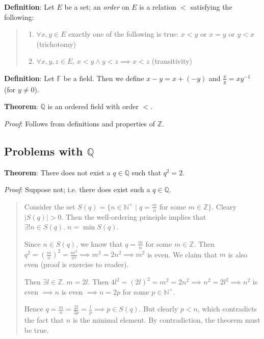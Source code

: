 \documentclass[11pt]{article}
\begin{document}
\textbf{Definition}: Let $E$ be a set; an \emph{order} on $E$ is a relation $<$ satisfying the following:
\begin{quote}\vspace{-0.3cm}
	\begin{enumerate}
	\item $\forall x,y \in E$ exactly one of the following is true: $x < y$ or $x = y$ or $y < x$ (trichotomy)
	\item $\forall x,y,z \in E$, $x < y \land y < z \implies x < z$ (transitivity)
	\end{enumerate}
\end{quote}

\textbf{Definition}: Let $\mathbb{F}$ be a field. Then we define $x - y = x + (-y)$ and $\frac{x}{y} = xy^{-1}$ (for $y \neq 0$).

\textbf{Theorem}: $\mathbb{Q}$ is an ordered field with order $<$.

\emph{Proof}: Follows from definitions and properties of $\mathbb{Z}$.


\subsection{Problems with $\mathbb{Q}$}

\textbf{Theorem}: There does not exist a $q \in \mathbb{Q}$ such that $q^2 = 2$.

\emph{Proof}: Suppose not; i.e. there does exist such a $q \in \mathbb{Q}$.
\begin{quote}\vspace{-0.3cm}
Consider the set $S(q) = \{n \in \mathbb{N}^+ \;|\; q = \frac{m}{n}$ for some $m \in \mathbb{Z}\}$. Cleary $|S(q)| > 0$. Then the well-ordering principle implies that $\exists !n \in S(q).\; n = \min S(q)$.

Since $n \in S(q)$, we know that $q = \frac{m}{n}$ for some $m \in \mathbb{Z}$. Then $q^2 = (\frac{m}{n})^2 = \frac{m^2}{n^2} \implies m^2 = 2n^2 \implies m^2$ is even. We claim that $m$ is also even (proof is exercise to reader).

Then $\exists l \in \mathbb{Z}.\; m = 2l$. Then $4l^2 = (2l)^2 = m^2 = 2n^2 \implies n^2 = 2l^2 \implies n^2$ is even $\implies n$ is even $\implies n = 2p$ for some $p \in \mathbb{N}^+$.

Hence $q = \frac{m}{n} = \frac{2l}{2p} = \frac{l}{p} \implies p \in S(q)$. But clearly $p < n$, which contradicts the fact that $n$ is the minimal element. By contradiction, the theorem must be true.
\end{quote}
\end{document}
